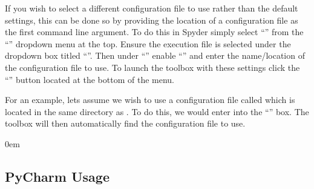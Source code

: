 \documentclass[letterpaper,10pt,english]{sphinxmanual}
\let\sphinxpxdimen\pdfpxdimen\else\newdimen\sphinxpxdimen
\begin{document}
\sphinxAtStartPar
If you wish to select a different configuration file to use rather than the default settings, this can be done so by
providing the location of a configuration file as the first command line argument. To do this in Spyder simply
select “” from the “” dropdown menu at the top. Ensure the execution file
 is selected under the dropdown box titled “”. Then under
“” enable “” and enter the name/location of the configuration file to use.
To launch the toolbox with these settings click the “” button located at the bottom of the menu.

\sphinxAtStartPar
For an example, lets assume we wish to use a configuration file called  which is located in the
same directory as . To do this, we would enter  into the
“” box. The toolbox will then automatically find the configuration file to use.

\begin{DUlineblock}{0em}
\item[] 
\end{DUlineblock}


\subsection{PyCharm Usage}
\label{\detokenize{usage/execution:pycharm-usage}}
\noindent{\hspace*{\fill}\sphinxincludegraphics[height=80\sphinxpxdimen]{{pycharm_icon}.png}\hspace*{\fill}}
\end{document}
